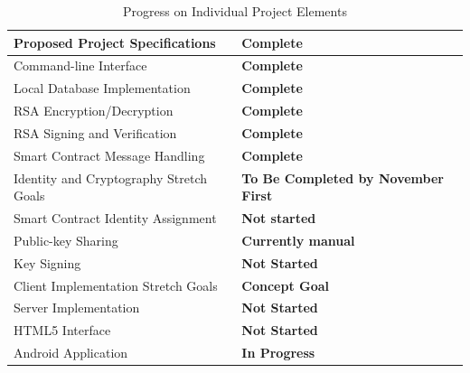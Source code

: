 \documentclass[titlepage]{report}
\begin{document}
\begin{table}[ht]
\begin{center}
\caption{Progress on Individual Project Elements}
\begin{tabular}{| l | p{5cm} |}
\hline
Proposed Project Specifications & \textbf{Complete} \\
\hline
Command-line Interface & \textbf{Complete} \\
Local Database Implementation & \textbf{Complete} \\
RSA Encryption/Decryption & \textbf{Complete} \\
RSA Signing and Verification & \textbf{Complete} \\
Smart Contract Message Handling & \textbf{Complete} \\
\hline
Identity and Cryptography Stretch Goals & \textbf{To Be Completed by November First} \\
\hline
Smart Contract Identity Assignment & \textbf{Not started} \\
Public-key Sharing & \textbf{Currently manual} \\
Key Signing & \textbf{Not Started} \\
\hline
Client Implementation Stretch Goals & \textbf{Concept Goal} \\
\hline
Server Implementation & \textbf{Not Started} \\
HTML5 Interface & \textbf{Not Started} \\
Android Application & \textbf{In Progress} \\
\hline
\end{tabular}
\end{center}
\end{table}

\listoftables
\listoffigures
\printindex
\printglossaries{}
\printbibliography{}
\end{document}
